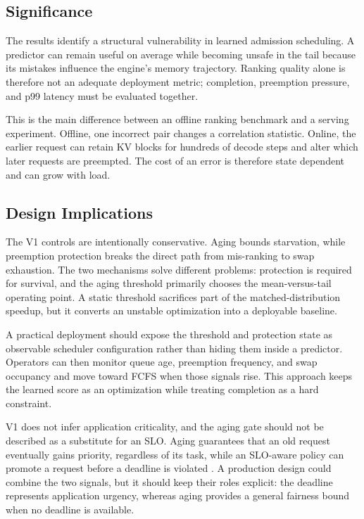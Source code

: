 \documentclass[conference]{IEEEtran}
\begin{document}
\subsection{Significance}
The results identify a structural vulnerability in learned admission scheduling. A predictor can remain useful on average while becoming unsafe in the tail because its mistakes influence the engine's memory trajectory. Ranking quality alone is therefore not an adequate deployment metric; completion, preemption pressure, and p99 latency must be evaluated together.

This is the main difference between an offline ranking benchmark and a serving experiment. Offline, one incorrect pair changes a correlation statistic. Online, the earlier request can retain KV blocks for hundreds of decode steps and alter which later requests are preempted. The cost of an error is therefore state dependent and can grow with load.

\subsection{Design Implications}
The V1 controls are intentionally conservative. Aging bounds starvation, while preemption protection breaks the direct path from mis-ranking to swap exhaustion. The two mechanisms solve different problems: protection is required for survival, and the aging threshold primarily chooses the mean-versus-tail operating point. A static threshold sacrifices part of the matched-distribution speedup, but it converts an unstable optimization into a deployable baseline.

A practical deployment should expose the threshold and protection state as observable scheduler configuration rather than hiding them inside a predictor. Operators can then monitor queue age, preemption frequency, and swap occupancy and move toward FCFS when those signals rise. This approach keeps the learned score as an optimization while treating completion as a hard constraint.

V1 does not infer application criticality, and the aging gate should not be described as a substitute for an SLO. Aging guarantees that an old request eventually gains priority, regardless of its task, while an SLO-aware policy can promote a request before a deadline is violated \cite{huang2025slo}. A production design could combine the two signals, but it should keep their roles explicit: the deadline represents application urgency, whereas aging provides a general fairness bound when no deadline is available.
\end{document}

